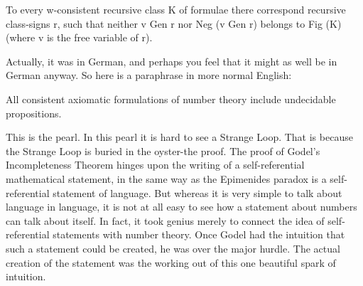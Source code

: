 To every w-consistent recursive class K of formulae there correspond recursive class-signs r, such that neither v Gen r nor Neg (v Gen r) belongs to Fig (K) (where v is the free variable of r). 

Actually, it was in German, and perhaps you feel that it might as well be in German anyway. So here is a paraphrase in more normal English: 

All consistent axiomatic formulations of number theory include undecidable propositions. 

This is the pearl. In this pearl it is hard to see a Strange Loop. That is because the Strange Loop is buried in the oyster-the proof. The proof of Godel's Incompleteness Theorem hinges upon the writing of a self-referential mathematical statement, in the same way as the Epimenides paradox is a self-referential statement of language. But whereas it is very simple to talk about language in language, it is not at all easy to see how a statement about numbers can talk about itself. In fact, it took genius merely to connect the idea of self-referential statements with number theory. Once Godel had the intuition that such a statement could be created, he was over the major hurdle. The actual creation of the statement was the working out of this one beautiful spark of intuition. 







